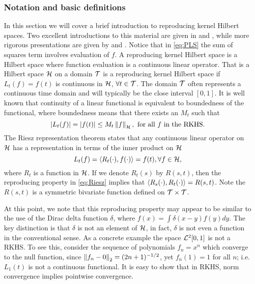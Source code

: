 \subsubsection{Notation and basic definitions}


In this section we will cover a brief introduction to reproducing kernel Hilbert spaces. Two excellent introductions to this material are given in \cite{Heckman:1997vp} and \cite{Storlie:2011tz}, while more rigorous presentations are given by \cite{Wahba:1990} and \cite{Aronszajn:1950tq}. 
Notice that in \eqref{eq:PLS} the sum of squares term involves evaluation of $f$. A reproducing kernel Hilbert space is a Hilbert space where function evaluation is a continuous linear operator. That is a Hilbert space $\mathcal{H}$ on a domain $\mathcal{T}$ is a reproducing kernel Hilbert space if $L_t(f) = f(t)$ is continuous in $\mathcal{H}$, $\forall t \in \mathcal{T}$. The domain $\mathcal{T}$ often represents a continuous time domain and will typically be the close interval $[0,1]$. It is well known that continuity of a linear functional is equivalent to boundedness of the functional, where boundedness means that there exists an $M_t$ such that 
\begin{equation*}
	|L_t(f)|=|f(t)|\leq M_t\left\|f\right\|_{\mathcal{H}}, \mbox{ for all $f$ in the RKHS}.
\label{eq:}
\end{equation*}
The Riesz representation theorem states that any continuous linear operator on $\mathcal{H}$ has a representation in terms of the inner product on $\mathcal{H}$
\begin{equation}
	L_t(f) = \langle R_t(\cdot), f(\cdot) \rangle = f(t), \forall f\in \mathcal{H},
\label{eq:Riesz}
\end{equation}
where $R_t$ is a function in $\mathcal{H}$. If we denote $R_t(s)$ by $R(s,t)$, then the reproducing property in \eqref{eq:Riesz} implies that $\langle R_s(\cdot),  R_t(\cdot) \rangle = R(s,t)$. Note the $R(s,t)$ is a symmetric bivariate function defined on $\mathcal{T}\times\mathcal{T}$. %

At this point, we note that this reproducing property may appear to be similar to the use of the Dirac delta function $\delta$, where $f(x)=\int\delta(x-y)f(y)dy$. The key distinction is that $\delta$ is not an element of $\mathcal{H}$, in fact, $\delta$ is not even a function in the conventional sense.  As a concrete example the space $\mathcal{L}^2[0,1]$ is not a RKHS. To see this, consider the sequence of polynomials $f_n = x^n$ which converge to the null function, since $\left\|f_n-0\right\|_2=(2n+1)^{-1/2}$, yet $f_n(1)=1$ for all $n$; i.e. $L_1(t)$ is not a continuous functional. It is easy to show that in RKHS, norm convergence implies pointwise convergence. 

